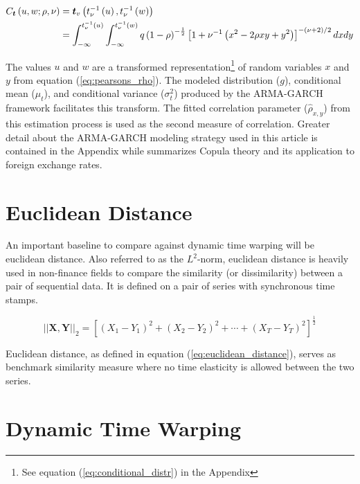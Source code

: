 \documentclass[12pt]{report}
\begin{document}
\begin{align} \label{eq:t_copula}
    C_{\boldsymbol{t}} \left(u, w; \rho,\nu \right) &= \boldsymbol{t}_{v}\left(t_{\nu}^{-1}\left(u\right), t_{\nu}^{-1}\left(w\right)\right) \\
    &= \int_{-\infty}^{t_{\nu}^{-1}\left(u\right)}\int_{-\infty}^{t_{\nu}^{-1}\left(w\right)}q\left(1-\rho\right)^{-\frac{1}{2}}\left[1+\nu^{-1}\left(x^{2}-2\rho xy + y^{2}\right)\right]^{-\left(\nu + 2\right)
    /2}dxdy \notag
\end{align}

The values $u$ and $w$ are a transformed representation\footnote{See equation (\ref{eq:conditional_distr}) in the Appendix} of random variables $x$ and $y$ from equation (\ref{eq:pearsons_rho}). The modeled distribution ($g$), conditional mean ($\mu_{t}$), and conditional variance ($\sigma_{t}^{2}$) produced by the ARMA-GARCH framework facilitates this transform. The fitted correlation parameter ($\hat{\rho}_{x, y}$) from this estimation process is used as the second measure of correlation. Greater detail about the ARMA-GARCH modeling strategy used in this article is contained in the Appendix while \cite{DowiakTV-COP} summarizes Copula theory and its application to foreign exchange rates.




\section{Euclidean Distance} \label{sec:euclidean_distance}

An important baseline to compare against dynamic time warping will be euclidean distance. Also referred to as the $L^{2}$-norm, euclidean distance is heavily used in non-finance fields to compare the similarity (or dissimilarity) between a pair of sequential data. It is defined on a pair of series with synchronous time stamps.

\begin{equation} \label{eq:euclidean_distance}
    ||\boldsymbol{X}, \boldsymbol{Y}||_{2} = \left[ (X_{1} - Y_{1})^{2} + (X_{2} - Y_{2})^{2} + \cdots + (X_{T} - Y_{T})^{2} \right]^{\frac{1}{2}}
\end{equation}

Euclidean distance, as defined in equation (\ref{eq:euclidean_distance}), serves as benchmark similarity measure where no time elasticity is allowed between the two series.

\section{Dynamic Time Warping} \label{sec:DTW}
\end{document}
